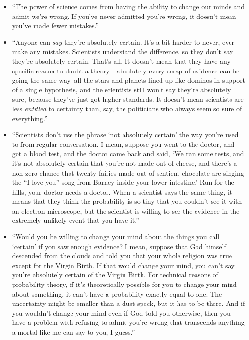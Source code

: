 \begin{itemize}
\item {
 ``The power of science comes from having the
ability to change our minds and admit we're wrong. If
you've never admitted you're wrong, it
doesn't mean you've made fewer
mistakes.''}

\item {
 ``Anyone can \textit{say} they're
absolutely certain. It's a bit harder to never, ever
make any mistakes. Scientists understand the difference, so they
don't say they're absolutely certain.
That's all. It doesn't mean that they
have any specific reason to doubt a theory---absolutely every scrap of
evidence can be going the same way, all the stars and planets lined up
like dominos in support of a single hypothesis, and the scientists
still won't say they're absolutely
sure, because they've just got higher standards. It
doesn't mean scientists are less \textit{entitled} to
certainty than, say, the politicians who always seem so sure of
everything.''}

\item {
 ``Scientists don't use the phrase
`not absolutely certain' the way
you're used to from regular conversation. I mean,
suppose you went to the doctor, and got a blood test, and the doctor
came back and said, `We ran some tests, and
it's not absolutely certain that you're
not made out of cheese, and there's a non-zero chance
that twenty fairies made out of sentient chocolate are singing the
``I love you'' song from Barney
inside your lower intestine.' Run for the hills, your
doctor needs a doctor. When a scientist says the same thing, it means
that they think the probability is so tiny that you
couldn't see it with an electron microscope, but the
scientist is willing to see the evidence in the extremely unlikely
event that you have it.''}

\item {
 ``Would you be willing to change your mind about
the things you call `certain' if you saw
enough evidence? I mean, suppose that God himself descended from the
clouds and told you that your whole religion was true except for the
Virgin Birth. If that would change your mind, you can't
say you're absolutely certain of the Virgin Birth. For
technical reasons of probability theory, if it's
theoretically possible for you to change your mind about something, it
can't have a probability exactly equal to one. The
uncertainty might be smaller than a dust speck, but it has to be there.
And if you wouldn't change your mind even if God told
you otherwise, then you have a problem with refusing to admit
you're wrong that transcends anything a mortal like me
can say to you, I guess.''}
\end{itemize}

